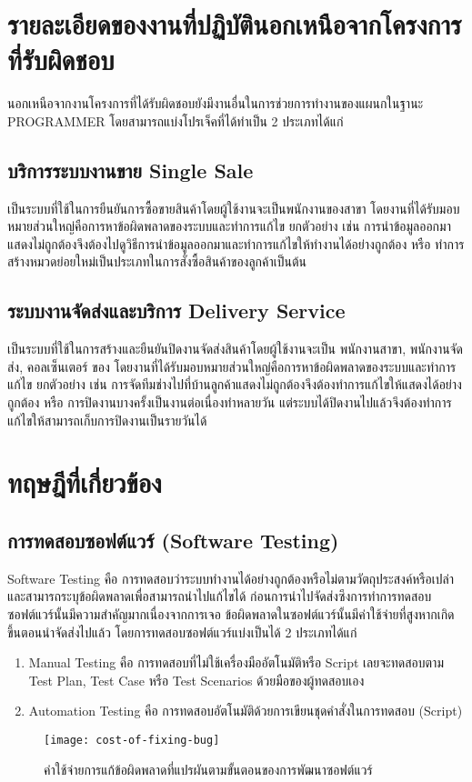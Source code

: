 \section{รายละเอียดของงานที่ปฏิบัตินอกเหนือจากโครงการที่รับผิดชอบ}
    นอกเหนือจากงานโครงการที่ได้รับผิดชอบยังมีงานอื่นในการช่วยการทำงานของแผนกในฐานะ PROGRAMMER โดยสามารถแบ่งโปรเจ็คที่ได้ทำเป็น 2 ประเภทได้แก่
    
    \subsection{บริการระบบงานขาย Single Sale}
        เป็นระบบที่ใช้ในการยืนยันการซื้อขายสินค้าโดยผู้ใช้งานจะเป็นพนักงานของสาขา {\Company} โดยงานที่ได้รับมอบหมายส่วนใหญ่คือการหาข้อผิดพลาดของระบบและทำการแก้ไข
        ยกตัวอย่าง เช่น การนำข้อมูลออกมาแสดงไม่ถูกต้องจึงต้องไปดูวิธีการนำข้อมูลออกมาและทำการแก้ไขให้ทำงานได้อย่างถูกต้อง หรือ ทำการสร้างหมวดย่อยใหม่เป็นประเภทในการสั่งซื้อสินค้าของลูกค้าเป็นต้น
    
    \subsection{ระบบงานจัดส่งและบริการ Delivery Service}
        เป็นระบบที่ใช้ในการสร้างและยืนยันปิดงานจัดส่งสินค้าโดยผู้ใช้งานจะเป็น พนักงานสาขา, พนักงานจัดส่ง, คอลเซ็นเตอร์ ของ {\Company} โดยงานที่ได้รับมอบหมายส่วนใหญ่คือการหาข้อผิดพลาดของระบบและทำการแก้ไข
        ยกตัวอย่าง เช่น การจัดทีมช่างไปที่บ้านลูกค้าแสดงไม่ถูกต้องจึงต้องทำการแก้ไขให้แสดงได้อย่างถูกต้อง หรือ การปิดงานบางครั้งเป็นงานต่อเนื่องทำหลายวัน
        แต่ระบบได้ปิดงานไปแล้วจึงต้องทำการแก้ไขให้สามารถเก็บการปิดงานเป็นรายวันได้

\section{ทฤษฎีที่เกี่ยวข้อง}
    \subsection{การทดสอบซอฟต์แวร์ (Software Testing)}
        Software Testing คือ การทดสอบว่าระบบทำงานได้อย่างถูกต้องหรือไม่ตามวัตถุประสงค์หรือเปล่าและสามารถระบุข้อผิดพลาดเพื่อสามารถนำไปแก้ไขได้
        ก่อนการนำไปจัดส่งซึงการทำการทดสอบซอฟต์แวร์นั้นมีความสำคัญมากเนื่องจากการเจอ ข้อผิดพลาดในซอฟต์แวร์นั้นมีค่าใช้จ่ายที่สูงหากเกิดขึ้นตอนนำจัดส่งไปแล้ว
        โดยการทดสอบซอฟต์แวร์แบ่งเป็นได้ 2 ประเภทได้แก่
        \begin{enumerate}
            \item Manual Testing คือ การทดสอบที่ไม่ใช้เครื่องมืออัตโนมัติหรือ Script เลยจะทดสอบตาม Test Plan, Test Case หรือ Test Scenarios ด้วยมือของผู้ทดสอบเอง
            \item Automation Testing คือ การทดสอบอัตโนมัติด้วยการเขียนชุดคำสั่งในการทดสอบ (Script)
        \end{enumerate}
        \begin{figure}[H]
            \centering
            \texttt{[image: cost-of-fixing-bug]}
            \caption{ค่าใช้จ่ายการแก้ข้อผิดพลาดที่แปรผันตามขั้นตอนของการพัฒนาซอฟต์แวร์}\label{cost-of-fixing-bug}
        \end{figure}

